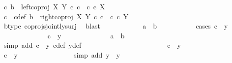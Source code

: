 \begin{isabellebody}
\ {\isachardoublequoteopen}{\isasymnexists}c{\isachardot}{\kern0pt}\ b\ {\isacharequal}{\kern0pt}\ left{\isacharunderscore}{\kern0pt}coproj\ X\ Y\ {\isasymcirc}\isactrlsub c\ c\ {\isasymand}\ c\ {\isasymin}\isactrlsub c\ X{\isachardoublequoteclose}\isanewline
\ \ \ \ \ \ \ \ \ \ \isamarkupfalse%
\ \isamarkupfalse%
\ c\ \ c{\isacharunderscore}{\kern0pt}def{\isacharcolon}{\kern0pt}\ {\isachardoublequoteopen}b\ {\isacharequal}{\kern0pt}\ right{\isacharunderscore}{\kern0pt}coproj\ X\ Y\ {\isasymcirc}\isactrlsub c\ c\ {\isasymand}\ c\ {\isasymin}\isactrlsub c\ Y{\isachardoublequoteclose}\isanewline
\ \ \ \ \ \ \ \ \ \ \ \ \isamarkupfalse%
\ b{\isacharunderscore}{\kern0pt}type\ coprojs{\isacharunderscore}{\kern0pt}jointly{\isacharunderscore}{\kern0pt}surj\ \isamarkupfalse%
\ blast\isanewline
\ \ \ \ \ \ \ \ \ \ \isamarkupfalse%
\ {\isachardoublequoteopen}a\ {\isacharequal}{\kern0pt}\ b{\isachardoublequoteclose}\isanewline
\ \ \ \ \ \ \ \ \ \ \isamarkupfalse%
{\isacharparenleft}{\kern0pt}cases\ {\isachardoublequoteopen}c\ {\isacharequal}{\kern0pt}\ y{\isachardoublequoteclose}{\isacharparenright}{\kern0pt}\isanewline
\ \ \ \ \ \ \ \ \ \ \ \ \isamarkupfalse%
\ {\isachardoublequoteopen}c\ {\isacharequal}{\kern0pt}\ y{\isachardoublequoteclose}\isanewline
\ \ \ \ \ \ \ \ \ \ \ \ \isamarkupfalse%
\ {\isachardoublequoteopen}a\ {\isacharequal}{\kern0pt}\ b{\isachardoublequoteclose}\isanewline
\ \ \ \ \ \ \ \ \ \ \ \ \ \ \isamarkupfalse%
\ {\isacharparenleft}{\kern0pt}simp\ add{\isacharcolon}{\kern0pt}\ {\isacartoucheopen}c\ {\isacharequal}{\kern0pt}\ y{\isacartoucheclose}\ c{\isacharunderscore}{\kern0pt}def\ y{\isacharunderscore}{\kern0pt}def{\isacharparenright}{\kern0pt}\isanewline
\ \ \ \ \ \ \ \ \ \ \isamarkupfalse%
\isanewline
\ \ \ \ \ \ \ \ \ \ \ \ \isamarkupfalse%
\ {\isachardoublequoteopen}c\ {\isasymnoteq}\ y{\isachardoublequoteclose}\isanewline
\ \ \ \ \ \ \ \ \ \ \ \ \isamarkupfalse%
\ \isamarkupfalse%
\ {\isachardoublequoteopen}c\ {\isasymnoteq}\ y{}{\isachardoublequoteclose}\isanewline
\ \ \ \ \ \ \ \ \ \ \ \ \ \ \isamarkupfalse%
\ {\isacharparenleft}{\kern0pt}simp\ add{\isacharcolon}{\kern0pt}\ {\isacartoucheopen}y\ {\isacharequal}{\kern0pt}\ y{}{\isacartoucheclose}{\isacharparenright}{\kern0pt}\isanewline
\ \ \ \ \ \ \ \ \ \ \ \ \isamarkupfalse%
\ \isamarkupfalse%

\end{isabellebody}

